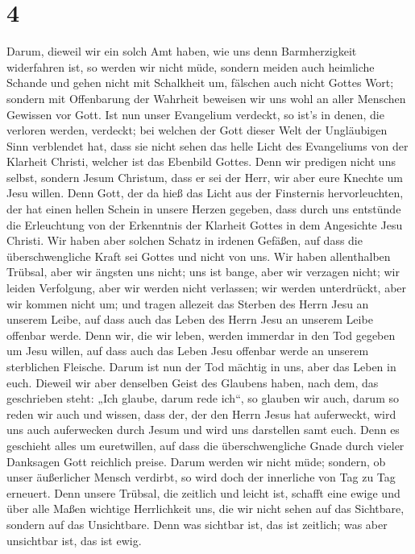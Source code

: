 \hypertarget{section-3}{%
\section{4}\label{section-3}}

 Darum, dieweil wir ein solch Amt haben, wie uns denn
Barmherzigkeit widerfahren ist, so werden wir nicht müde, 
sondern meiden auch heimliche Schande und gehen nicht mit Schalkheit um,
fälschen auch nicht Gottes Wort; sondern mit Offenbarung der Wahrheit
beweisen wir uns wohl an aller Menschen Gewissen vor Gott.
 Ist nun unser Evangelium verdeckt, so ist's in denen, die
verloren werden, verdeckt;  bei welchen der Gott dieser
Welt der Ungläubigen Sinn verblendet hat, dass sie nicht sehen das helle
Licht des Evangeliums von der Klarheit Christi, welcher ist das Ebenbild
Gottes.  Denn wir predigen nicht uns selbst, sondern Jesum
Christum, dass er sei der Herr, wir aber eure Knechte um Jesu willen.
 Denn Gott, der da hieß das Licht aus der Finsternis
hervorleuchten, der hat einen hellen Schein in unsere Herzen gegeben,
dass durch uns entstünde die Erleuchtung von der Erkenntnis der Klarheit
Gottes in dem Angesichte Jesu Christi.  Wir haben aber
solchen Schatz in irdenen Gefäßen, auf dass die überschwengliche Kraft
sei Gottes und nicht von uns.  Wir haben allenthalben
Trübsal, aber wir ängsten uns nicht; uns ist bange, aber wir verzagen
nicht;  wir leiden Verfolgung, aber wir werden nicht
verlassen; wir werden unterdrückt, aber wir kommen nicht um;
 und tragen allezeit das Sterben des Herrn Jesu an
unserem Leibe, auf dass auch das Leben des Herrn Jesu an unserem Leibe
offenbar werde.  Denn wir, die wir leben, werden immerdar
in den Tod gegeben um Jesu willen, auf dass auch das Leben Jesu offenbar
werde an unserem sterblichen Fleische.  Darum ist nun der
Tod mächtig in uns, aber das Leben in euch.  Dieweil wir
aber denselben Geist des Glaubens haben, nach dem, das geschrieben
steht: „Ich glaube, darum rede ich``, so glauben wir auch, darum so
reden wir auch  und wissen, dass der, der den Herrn Jesus
hat auferweckt, wird uns auch auferwecken durch Jesum und wird uns
darstellen samt euch.  Denn es geschieht alles um
euretwillen, auf dass die überschwengliche Gnade durch vieler Danksagen
Gott reichlich preise.  Darum werden wir nicht müde;
sondern, ob unser äußerlicher Mensch verdirbt, so wird doch der
innerliche von Tag zu Tag erneuert.  Denn unsere Trübsal,
die zeitlich und leicht ist, schafft eine ewige und über alle Maßen
wichtige Herrlichkeit  uns, die wir nicht sehen auf das
Sichtbare, sondern auf das Unsichtbare. Denn was sichtbar ist, das ist
zeitlich; was aber unsichtbar ist, das ist ewig.

